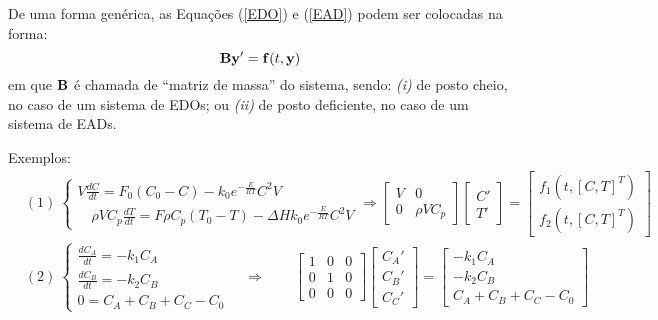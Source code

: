 \documentclass[12pt]{peqdoc}
\begin{document}
	De uma forma genérica, as Equações (\ref{EDO}) e (\ref{EAD}) podem ser colocadas na forma:
	\begin{equation}
	\mathbf{B}\mathbf{y}'=\mathbf{f}(t,\mathbf{y})
	\end{equation}
	\noindent em que $\mathbf{B}$ é chamada de ``matriz de massa'' do sistema, sendo: \textit{(i)} de posto cheio, no caso de um sistema de EDOs; ou \textit{(ii)} de posto deficiente, no caso de um sistema de EADs.
	
	\noindent Exemplos:
	\begin{align*}
	&(1)\ \left\{\begin{matrix}
	\displaystyle V\frac{dC}{dt} = F_0(C_0-C) - k_0e^{-\frac{E}{RT}}C^2V\\[2ex]
	\displaystyle\quad \rho VC_p\frac{dT}{dt} = F\rho C_p(T_0-T) - \Delta Hk_0e^{-\frac{E}{RT}}C^2V
	\end{matrix}\right. \Rightarrow  \left[\begin{matrix}
	V&0\\0&\rho VC_p
	\end{matrix}\right]\left[\begin{matrix}
	C'\\T'
	\end{matrix}\right]=\left[\begin{matrix}
	f_1(t,[C, T]^T)\\f_2(t,[C, T]^T)
	\end{matrix}\right]\\[2ex]
	&(2)\ \left\{\begin{matrix}
	\displaystyle \frac{dC_A}{dt} = -k_1C_A\\[2ex]
	\displaystyle \frac{dC_B}{dt} = -k_2C_B\\[2ex]
	0 = C_A + C_B + C_C - C_0
	\end{matrix}\right. \quad\Rightarrow \qquad
	\left[\begin{matrix}
	1 & 0 & 0 \\
	0 & 1 & 0 \\
	0 & 0 & 0 
	\end{matrix}\right]\left[\begin{matrix}
	C_A' \\ C_B' \\ C_C'
	\end{matrix}\right]=\left[\begin{matrix}
	-k_1C_A \\ -k_2C_B \\ C_A + C_B + C_C - C_0
	\end{matrix}\right]
	\end{align*}
	
\end{document}
